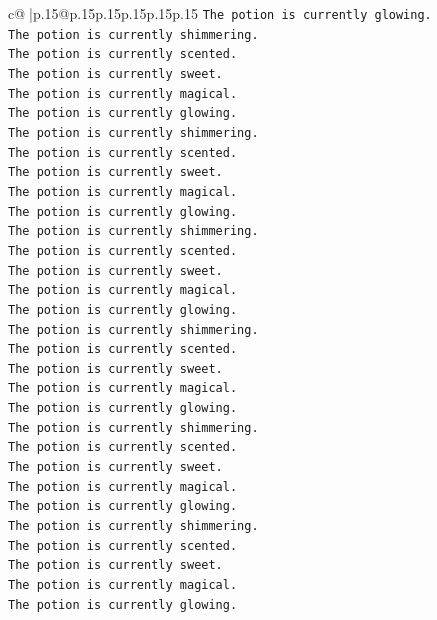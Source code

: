 \documentclass{article}
\begin{document}
{\begin{supertabular}{c@{$\;$}|p{.15\linewidth}@{}p{.15\linewidth}p{.15\linewidth}p{.15\linewidth}p{.15\linewidth}p{.15\linewidth}}
{{{\texttt{The potion is currently glowing.} \\
\texttt{The potion is currently shimmering.} \\
\texttt{The potion is currently scented.} \\
\texttt{The potion is currently sweet.} \\
\texttt{The potion is currently magical.} \\
\texttt{The potion is currently glowing.} \\
\texttt{The potion is currently shimmering.} \\
\texttt{The potion is currently scented.} \\
\texttt{The potion is currently sweet.} \\
\texttt{The potion is currently magical.} \\
\texttt{The potion is currently glowing.} \\
\texttt{The potion is currently shimmering.} \\
\texttt{The potion is currently scented.} \\
\texttt{The potion is currently sweet.} \\
\texttt{The potion is currently magical.} \\
\texttt{The potion is currently glowing.} \\
\texttt{The potion is currently shimmering.} \\
\texttt{The potion is currently scented.} \\
\texttt{The potion is currently sweet.} \\
\texttt{The potion is currently magical.} \\
\texttt{The potion is currently glowing.} \\
\texttt{The potion is currently shimmering.} \\
\texttt{The potion is currently scented.} \\
\texttt{The potion is currently sweet.} \\
\texttt{The potion is currently magical.} \\
\texttt{The potion is currently glowing.} \\
\texttt{The potion is currently shimmering.} \\
\texttt{The potion is currently scented.} \\
\texttt{The potion is currently sweet.} \\
\texttt{The potion is currently magical.} \\
\texttt{The potion is currently glowing.} \\
}}}
\end{supertabular}}
\end{document}
